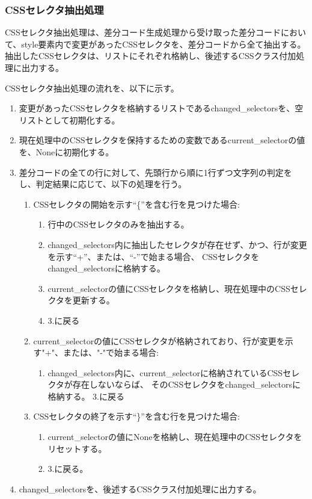 \subsubsection{CSSセレクタ抽出処理}\label{subsubsec: style_analysis}
CSSセレクタ抽出処理は、差分コード生成処理から受け取った差分コードにおいて、style要素内で変更があったCSSセレクタ\cite{CssSelector}を、差分コードから全て抽出する。
抽出したCSSセレクタは、リストにそれぞれ格納し、後述するCSSクラス付加処理に出力する。
\par
CSSセレクタ抽出処理の流れを、以下に示す。
\begin{enumerate}
    \item 変更があったCSSセレクタを格納するリストであるchanged\_selectorsを、空リストとして初期化する。
    \item 現在処理中のCSSセレクタを保持するための変数であるcurrent\_selectorの値を、Noneに初期化する。
    \item 差分コードの全ての行に対して、先頭行から順に1行ずつ文字列の判定をし、判定結果に応じて、以下の処理を行う。
          \begin{enumerate}
              \item CSSセレクタの開始を示す“\{”を含む行を見つけた場合:
                    \begin{enumerate}
                        \item 行中のCSSセレクタのみを抽出する。
                        \item changed\_selectors内に抽出したセレクタが存在せず、かつ、行が変更を示す“+”、または、“-”で始まる場合、
                              CSSセレクタをchanged\_selectorsに格納する。
                        \item current\_selectorの値にCSSセレクタを格納し、現在処理中のCSSセレクタを更新する。
                        \item 3.に戻る
                    \end{enumerate}
              \item current\_selectorの値にCSSセレクタが格納されており、行が変更を示す"+"、または、"-"で始まる場合:
                    \begin{enumerate}
                        \item changed\_selectors内に、current\_selectorに格納されているCSSセレクタが存在しないならば、
                              そのCSSセレクタをchanged\_selectorsに格納する。
                              3.に戻る
                    \end{enumerate}
              \item CSSセレクタの終了を示す“\}”を含む行を見つけた場合:
                    \begin{enumerate}
                        \item current\_selectorの値にNoneを格納し、現在処理中のCSSセレクタをリセットする。
                        \item 3.に戻る。
                    \end{enumerate}
          \end{enumerate}
    \item changed\_selectorsを、後述するCSSクラス付加処理に出力する。
\end{enumerate}

